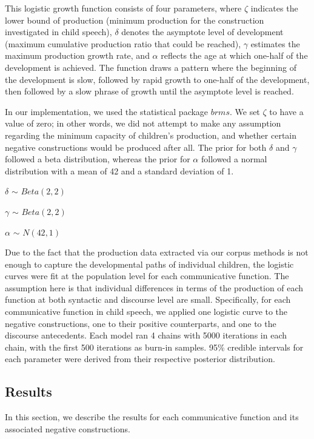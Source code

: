 \documentclass[
  english,
  man,floatsintext]{apa6}
\begin{document}
This logistic growth function consists of four parameters, where \(\zeta\) indicates the lower bound of production (minimum production for the construction investigated in child speech), \(\delta\) denotes the asymptote level of development (maximum cumulative production ratio that could be reached), \(\gamma\) estimates the maximum production growth rate, and \(\alpha\) reflects the age at which one-half of the development is achieved. The function draws a pattern where the beginning of the development is slow, followed by rapid growth to one-half of the development, then followed by a slow phrase of growth until the asymptote level is reached.

In our implementation, we used the statistical package \(brms\). We set \(\zeta\) to have a value of zero; in other words, we did not attempt to make any assumption regarding the minimum capacity of children's production, and whether certain negative constructions would be produced after all. The prior for both \(\delta\) and \(\gamma\) followed a beta distribution, whereas the prior for \(\alpha\) followed a normal distribution with a mean of 42 and a standard deviation of 1.

\(\delta\) \(\sim\) \(Beta(2, 2)\)

\(\gamma\) \(\sim\) \(Beta(2, 2)\)

\(\alpha\) \(\sim\) \(N(42, 1)\)

Due to the fact that the production data extracted via our corpus methods is not enough to capture the developmental paths of individual children, the logistic curves were fit at the population level for each communicative function. The assumption here is that individual differences in terms of the production of each function at both syntactic and discourse level are small. Specifically, for each communicative function in child speech, we applied one logistic curve to the negative constructions, one to their positive counterparts, and one to the discourse antecedents. Each model ran 4 chains with 5000 iterations in each chain, with the first 500 iterations as burn-in samples. 95\% credible intervals for each parameter were derived from their respective posterior distribution.

\hypertarget{results}{%
\subsection{Results}\label{results}}

In this section, we describe the results for each communicative function and its associated negative constructions.
\end{document}
